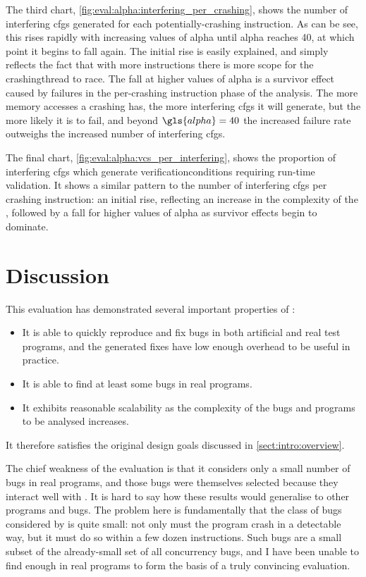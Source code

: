 The third chart, \autoref{fig:eval:alpha:interfering_per_crashing},
shows the number of interfering \glspl{cfg} generated for each
potentially-crashing instruction.  As can be see, this rises rapidly
with increasing values of \gls{alpha} until \gls{alpha} reaches 40, at
which point it begins to fall again.  The initial rise is easily
explained, and simply reflects the fact that with more instructions
there is more scope for the \gls{crashingthread} to race.  The fall at
higher values of \gls{alpha} is a survivor effect caused by failures
in the per-crashing instruction phase of the analysis.  The more
memory accesses a crashing {\StateMachine} has, the more interfering
\glspl{cfg} it will generate, but the more likely it is to fail, and
beyond $\gls{alpha}=40$ the increased failure rate outweighs the
increased number of interfering \glspl{cfg}.

The final chart, \autoref{fig:eval:alpha:vcs_per_interfering}, shows
the proportion of interfering \glspl{cfg} which generate
\glspl{verificationcondition} requiring run-time validation.  It shows
a similar pattern to the number of interfering \glspl{cfg} per
crashing instruction: an initial rise, reflecting an increase in the
complexity of the {\StateMachines}, followed by a fall for higher
values of \gls{alpha} as survivor effects begin to dominate.

\section{Discussion}

This evaluation has demonstrated several important properties of
{\technique}:
\begin{itemize}
\item It is able to quickly reproduce and fix bugs in both artificial
  and real test programs, and the generated fixes have low enough
  overhead to be useful in practice.
\item It is able to find at least some bugs in real programs.
\item It exhibits reasonable scalability as the complexity of the
  bugs and programs to be analysed increases.
\end{itemize}
It therefore satisfies the original design goals discussed in
\autoref{sect:intro:overview}.

The chief weakness of the evaluation is that it considers only a small
number of bugs in real programs, and those bugs were themselves
selected because they interact well with {\technique}.  It is hard to
say how these results would generalise to other programs and bugs.
The problem here is fundamentally that the class of bugs considered by
{\technique} is quite small: not only must the program crash in a
detectable way, but it must do so within a few dozen instructions.
Such bugs are a small subset of the already-small set of all
concurrency bugs, and I have been unable to find enough in real
programs to form the basis of a truly convincing evaluation.

